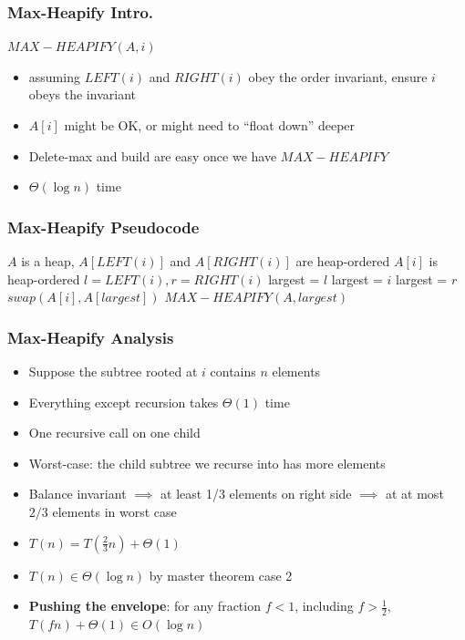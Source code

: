 \documentclass{beamer}
\begin{document}
\begin{frame} \frametitle{Max-Heapify Intro.}

$MAX-HEAPIFY(A, i)$
\begin{itemize}
  \item assuming $LEFT(i)$ and $RIGHT(i)$ obey the order invariant, ensure $i$
    obeys the invariant
  \item $A[i]$ might be OK, or might need to ``float down'' deeper
  \item Delete-max and build are easy once we have $MAX-HEAPIFY$
  \item $\Theta(\log n)$ time
\end{itemize}
\end{frame}

\begin{frame} \frametitle{Max-Heapify Pseudocode}
{\small
\begin{algorithmic}[1]
  \Require $A$ is a heap, $A[LEFT(i)]$ and $A[RIGHT(i)]$ are heap-ordered
  \Ensure $A[i]$ is heap-ordered
  \State $l = LEFT(i), r = RIGHT(i)$
    \State largest = $l$
  \Else
    \State largest = $i$
  \EndIf
    \State largest = $r$
  \EndIf
    \State $swap(A[i], A[largest])$
    \State $MAX-HEAPIFY(A, largest)$
  \EndIf
  \EndFunction
\end{algorithmic}
} %
\end{frame}

\begin{frame} \frametitle{Max-Heapify Analysis}
\begin{itemize}
  \item Suppose the subtree rooted at $i$ contains $n$ elements
  \item Everything except recursion takes $\Theta(1)$ time
  \item One recursive call on one child
  \item Worst-case: the child subtree we recurse into has more elements
  \item Balance invariant $\implies$ at least 1/3 elements on right side $\implies$ at at most $2/3$ elements in worst case
  \item $T(n) = T(\frac{2}{3}n) + \Theta(1)$
  \item $T(n) \in \Theta(\log n)$ by master theorem case 2
  \item \textbf{Pushing the envelope}: for any fraction $f<1$,
    including $f>\frac{1}{2}$,
    $T(fn)+\Theta(1) \in O(\log n)$
\end{itemize}
\end{frame}
\end{document}
